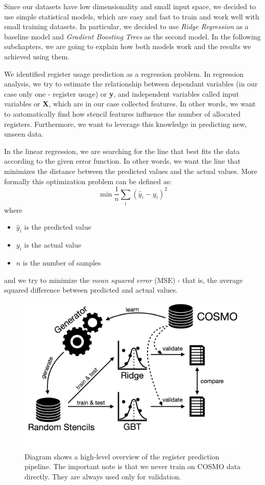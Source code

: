 \documentclass[sigplan,\review anonymous]{acmart}
\begin{document}
Since our datasets have low dimensionality and small input space, we decided
to use simple statistical models, which are easy and fast to train and work
well with small training datasets. In particular, we decided to use
\textit{Ridge Regression} as a baseline model and
\textit{Gradient Boosting Trees} as the second model. In the following
subchapters, we are going to explain how both models work and the results
we achieved using them.

We identified register usage prediction as a regression \cite{regression}
problem. In regression analysis, we try to estimate the relationship between
dependant variables (in our case only one - register usage) or \textbf{y}, and
independent variables called input variables or \textbf{X}, which are in our
case collected features. In other words, we want to automatically find how
stencil features influence the number of allocated registers. Furthermore,
we want to leverage this knowledge in predicting new, unseen data. 

In the linear regression, we are searching for the line that best fits the
data according to the given error function. In other words, we want the line
that minimizes the distance between the predicted values and the actual values.
More formally this optimization problem can be defined as:
\begin{equation}
\min \frac{1}{n} \sum_i (\hat{y}_i - y_i)^2
\end{equation}
\noindent where

\begin{itemize}
  \item []$\hat{y}_i$ is the predicted value
  \item []$y_i$ is the actual value
  \item []$n$ is the number of samples
\end{itemize}
\noindent and we try to minimize the \textit{mean squared error} (MSE) -
that is, the average squared difference between predicted and actual values.

\begin{figure}
  \centering
  \includegraphics[width=0.9\columnwidth]{images/reg_pred_diagram.png}
  \caption{Diagram shows a high-level overview of the register prediction
  pipeline. The important note is that we never train on COSMO data directly.
  They are always used only for validation.}
  \label{fig:reg_pred_diagram}
\end{figure}
\end{document}
